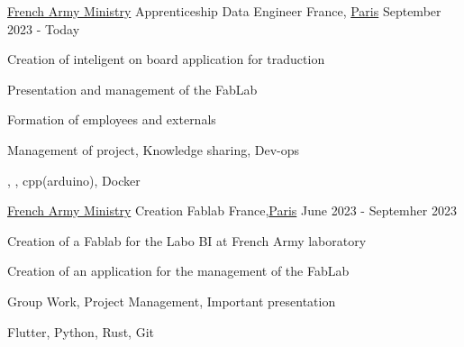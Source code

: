 

\begin{cventries}

	\cventry
	{\href{https://www.defense.gouv.fr/}{French Army Ministry}}
	{Apprenticeship Data Engineer} %
	{France, \href{https://www.paris.fr/}{Paris}} %
	{September 2023 - Today} %
	{
		\begin{cvitems} %
			\item {Creation of inteligent on board application for traduction}
			\item {Presentation and management of the FabLab}
			\item {Formation of employees and externals}
		\end{cvitems}
	}
	{
		\begin{cvitemsskills} %
			\item {Management of project, Knowledge sharing, Dev-ops}
			\item {\linux, \python, cpp(arduino), Docker }
		\end{cvitemsskills}
	}

	\cventry
	{\href{https://www.defense.gouv.fr/}{French Army Ministry}}
	{Creation Fablab} %
	{France,\href{https://www.paris.fr/}{Paris}} %
	{June 2023 - Septemher 2023} %
	{
		\begin{cvitems} %
			\item {Creation of a Fablab for the Labo BI at French Army laboratory}
			\item {Creation of an application for the management of the FabLab}
		\end{cvitems}
	}
	{
		\begin{cvitemsskills} %
			\item {Group Work, Project Management, Important presentation}
			\item {Flutter, Python, Rust, Git }
		\end{cvitemsskills}
	}


\end{cventries}
